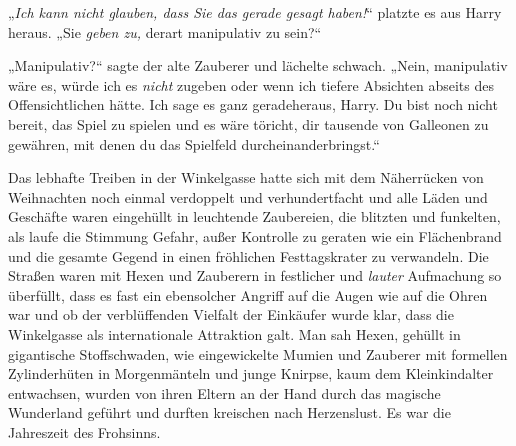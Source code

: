 „\emph{Ich kann nicht glauben, dass Sie das gerade gesagt haben!}“ platzte es aus Harry heraus.
„Sie \emph{geben zu,} derart manipulativ zu sein?“

„Manipulativ?“ sagte der alte Zauberer und lächelte schwach.
„Nein, manipulativ wäre es, würde ich es \emph{nicht} zugeben oder wenn ich tiefere Absichten abseits des Offensichtlichen hätte. Ich sage es ganz geradeheraus, Harry. Du bist noch nicht bereit, das Spiel zu spielen und es wäre töricht, dir tausende von Galleonen zu gewähren, mit denen du das Spielfeld durcheinanderbringst.“

\later

Das lebhafte Treiben in der Winkelgasse hatte sich mit dem Näherrücken von Weihnachten noch einmal verdoppelt und verhundertfacht und alle Läden und Geschäfte waren eingehüllt in leuchtende Zaubereien, die blitzten und funkelten, als laufe die Stimmung Gefahr, außer Kontrolle zu geraten wie ein Flächenbrand und die gesamte Gegend in einen fröhlichen Festtagskrater zu verwandeln. Die Straßen waren mit Hexen und Zauberern in festlicher und \emph{lauter} Aufmachung so überfüllt, dass es fast ein ebensolcher Angriff auf die Augen wie auf die Ohren war und ob der verblüffenden Vielfalt der Einkäufer wurde klar, dass die Winkelgasse als internationale Attraktion galt. Man sah Hexen, gehüllt in gigantische Stoffschwaden, wie eingewickelte Mumien und Zauberer mit formellen Zylinderhüten in Morgenmänteln und junge Knirpse, kaum dem Kleinkindalter entwachsen, wurden von ihren Eltern an der Hand durch das magische Wunderland geführt und durften kreischen nach Herzenslust. Es war die Jahreszeit des Frohsinns.%

